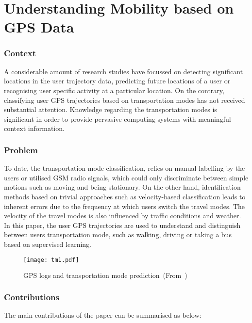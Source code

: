 \newpage
\section{Understanding Mobility based on GPS Data~\cite{Zheng:2008:UMB:1409635.1409677}} \label{lect2}

\subsubsection*{Context}

A considerable amount of research studies have focussed on detecting significant locations
in the user trajectory data, predicting future locations of a user or recognising user specific
activity at a particular location. On the contrary, classifying user GPS trajectories
based on transportation modes has not received substantial attention. Knowledge regarding
the transportation modes is significant in order to provide pervasive computing systems with
meaningful context information.

\subsubsection*{Problem}

To date, the transportation mode classification, relies on manual labelling by the users or
utilised GSM radio signals, which could only discriminate between simple motions such as moving
and being stationary. On the other hand, identification methods based on trivial approaches such
as velocity-based classification leads to inherent errors due to the frequency at which users
switch the travel modes. The velocity of the travel modes is also influenced by traffic conditions
and weather. In this paper, the user GPS trajectories are used to understand and
distinguish between users transportation mode, such as walking, driving or taking a bus based on
supervised learning.

\begin{figure}[h]
\centering
\texttt{[image: tm1.pdf]}
\caption{GPS logs and transportation mode prediction~(From~\cite{Zheng:2008:UMB:1409635.1409677})}
\end{figure}

\subsubsection*{Contributions}

The main contributions of the paper can be summarised as below:

